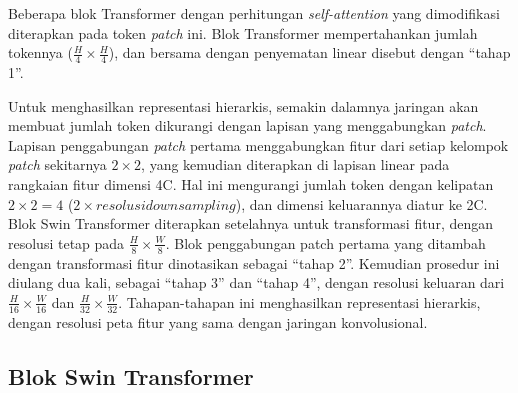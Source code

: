 Beberapa blok Transformer dengan perhitungan \emph{self-attention} yang dimodifikasi diterapkan pada token \emph{patch} ini. Blok Transformer mempertahankan jumlah tokennya 
(\begin{math}\frac{H}{4} \times \frac{H}{4}\end{math}), dan bersama dengan penyematan linear disebut dengan “tahap 1”. \parencite{Liu2021}

Untuk menghasilkan representasi hierarkis, semakin dalamnya jaringan akan membuat jumlah token dikurangi dengan lapisan yang menggabungkan \emph{patch}. Lapisan penggabungan \emph{patch} pertama menggabungkan 
fitur dari setiap kelompok \emph{patch} sekitarnya \begin{math}2 \times 2\end{math}, yang kemudian diterapkan di lapisan linear pada rangkaian fitur dimensi 4C. Hal ini mengurangi jumlah token dengan 
kelipatan \begin{math}2 \times 2 = 4\end{math} (\begin{math}2 \times resolusi downsampling\end{math}), dan dimensi keluarannya diatur ke 2C. Blok Swin Transformer diterapkan setelahnya untuk 
transformasi fitur, dengan resolusi tetap pada \begin{math}\frac{H}{8} \times \frac{W}{8}\end{math}. Blok penggabungan patch pertama yang ditambah dengan transformasi fitur dinotasikan sebagai 
“tahap 2”. Kemudian prosedur ini diulang dua kali, sebagai “tahap 3” dan “tahap 4”, dengan resolusi keluaran dari \begin{math}\frac{H}{16} \times \frac{W}{16}\end{math} dan 
\begin{math}\frac{H}{32} \times \frac{W}{32}\end{math}. Tahapan-tahapan ini menghasilkan representasi hierarkis, dengan resolusi peta fitur yang sama dengan jaringan konvolusional. \parencite{Liu2021}

\subsection{Blok Swin Transformer}

